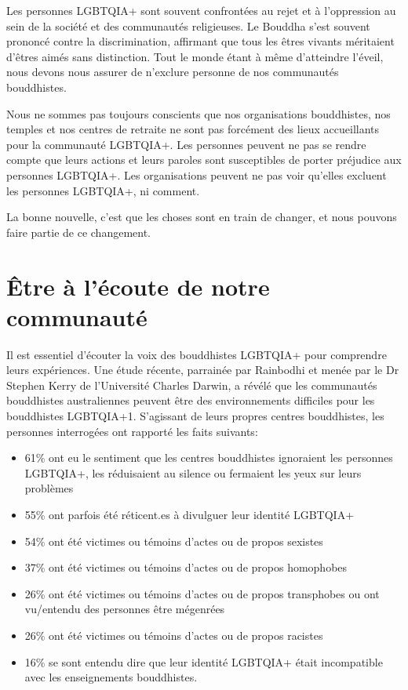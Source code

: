 \documentclass[12pt,openany]{book}
\begin{document}
\noindent Les personnes \mbox{LGBTQIA+} sont souvent confrontées au rejet et à l’oppression au sein de la société et des communautés religieuses. Le Bouddha s’est souvent prononcé contre la discrimination, affirmant que tous les êtres vivants méritaient d’êtres aimés sans distinction.
Tout le monde étant à même d’atteindre l’éveil, nous devons nous assurer de n’exclure personne de nos communautés bouddhistes.

Nous ne sommes pas toujours conscients que nos organisations bouddhistes, nos temples et nos centres de retraite ne sont pas forcément des lieux accueillants pour la communauté \mbox{LGBTQIA+}. Les personnes peuvent ne pas se rendre compte que leurs actions et leurs paroles sont susceptibles de porter préjudice aux personnes \mbox{LGBTQIA+}. Les organisations peuvent ne pas voir qu’elles excluent les personnes \mbox{LGBTQIA+}, ni comment.

La bonne nouvelle, c’est que les choses sont en train de changer, et nous pouvons faire partie de ce changement.

\section*{Être à l’écoute de notre communauté}

\noindent Il est essentiel d’écouter la voix des bouddhistes \mbox{LGBTQIA+} pour comprendre leurs expériences. Une étude récente, parrainée par Rainbodhi et menée par le Dr Stephen Kerry de l’Université Charles Darwin, a révélé que les communautés bouddhistes australiennes peuvent être des environnements difficiles pour les bouddhistes \mbox{LGBTQIA+}1. S’agissant de leurs propres centres bouddhistes, les personnes interrogées ont rapporté les faits suivants:

\begin{itemize}[label=\textbullet, leftmargin=*]
\setlength\itemsep{-0.3em}
  \item 61\% ont eu le sentiment que les centres bouddhistes ignoraient les personnes \mbox{LGBTQIA+}, les réduisaient au silence ou fermaient les yeux sur leurs problèmes
  \item 55\% ont parfois été réticent.es à divulguer leur identité \mbox{LGBTQIA+}
  \item 54\% ont été victimes ou témoins d’actes ou de propos sexistes
  \item 37\% ont été victimes ou témoins d’actes ou de propos homophobes
  \item 26\% ont été victimes ou témoins d’actes ou de propos transphobes ou ont vu/entendu des personnes être mégenrées
  \item 26\% ont été victimes ou témoins d’actes ou de propos racistes
  \item 16\% se sont entendu dire que leur identité \mbox{LGBTQIA+} était incompatible avec les enseignements bouddhistes.
\end{itemize}
\end{document}
